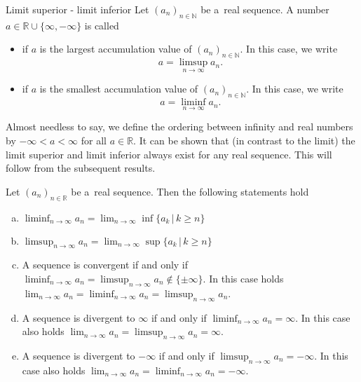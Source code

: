 \begin{Definition}{Limit superior - limit inferior}
\label{defliminfsup}
Let $(a_n)_{n\in\mathbb{N}}$ be a~real sequence. A number $a\in\mathbb{R}\cup\{\infty,-\infty\}$ is called
\begin{itemize}
 \item {} if $a$ is the largest accumulation value of $(a_n)_{n\in\mathbb{N}}$. In this case, we write
\[a=\limsup_{n\rightarrow\infty} a_n.\]
 \item {} if $a$ is the smallest accumulation value of $(a_n)_{n\in\mathbb{N}}$. In this case, we write
\[a=\liminf_{n\rightarrow\infty} a_n.\]
\end{itemize}
\end{Definition}
\begin{Remark}{}
Almost needless to say, we define the ordering between infinity and real numbers by $-\infty<a<\infty$ for all $a\in\mathbb{R}$. It can be shown that (in contrast to the limit) the limit superior and limit inferior always exist for any real sequence. This will follow from the subsequent results.
\end{Remark}

\begin{Lemma}{}
Let $(a_n)_{n\in\mathbb{R}}$ be a~real sequence. Then the following statements hold
\begin{enumerate}[a)]
\item
$\displaystyle \liminf_{n\rightarrow\infty} a_n=\lim_{n\rightarrow\infty}\inf\{a_k\,| \,k\geq n\}$ \\
\item
$\displaystyle \limsup_{n\rightarrow\infty} a_n=\lim_{n\rightarrow\infty}\sup\{a_k\,|\,k\geq n\}$ \\
\item
A sequence is convergent if and only if $\liminf_{n\rightarrow\infty} a_n=\limsup_{n\rightarrow\infty} a_n\not\in\{\pm\infty\}$. In this case holds $\lim_{n\rightarrow\infty}a_n=\liminf_{n\rightarrow\infty} a_n=\limsup_{n\rightarrow\infty} a_n$.\\
\item
A sequence is divergent to $\infty$ if and only if $\liminf_{n\rightarrow\infty} a_n=\infty$. In this case also holds $\lim_{n\rightarrow\infty}a_n=\limsup_{n\rightarrow\infty} a_n=\infty$.\\
\item
A sequence is divergent to $-\infty$ if and only if $\limsup_{n\rightarrow\infty} a_n=-\infty$. In this case also holds $\lim_{n\rightarrow\infty}a_n=\liminf_{n\rightarrow\infty} a_n=-\infty$.\\
\end{enumerate}

\end{Lemma}

